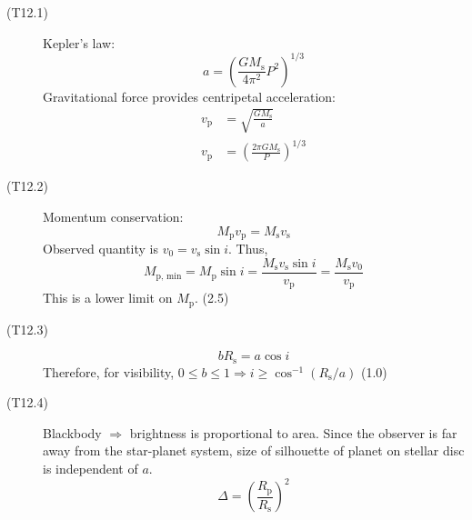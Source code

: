 \begin{description}
\item[(T12.1)] Kepler's law:
\[
a = \left(\frac{GM_{\mathrm{s}}}{4\pi^2}P^2\right)^{1/3} \tag*{(1.0)}
\]
Gravitational force provides centripetal acceleration:
\begin{align*}
v_{\mathrm{p}} &= \sqrt{\frac{GM_{\mathrm{s}}}{a}} \tag*{(0.5)}\\
v_{\mathrm{p}} &= \left(\frac{2\pi GM_{\mathrm{s}}}{P}\right)^{1/3}
  \tag*{(1.5)}
\end{align*}

\item[(T12.2)] Momentum conservation:
\[
M_{\mathrm{p}}v_{\mathrm{p}} = M_{\mathrm{s}}v_{\mathrm{s}} \tag*{(1.5)}
\]
Observed quantity is $v_0 = v_{\mathrm{s}}\sin i$. Thus,
\[
M_{\mathrm{p,\,min}} = M_{\mathrm{p}}\sin i
 = \frac{M_{\mathrm{s}}v_{\mathrm{s}}\sin i}{v_{\mathrm{p}}}
 = \frac{M_{\mathrm{s}}v_0}{v_{\mathrm{p}}}
\]
This is a lower limit on $M_{\mathrm{p}}$. \hfill(2.5)

\item[(T12.3)]
\[
bR_{\mathrm{s}} = a\cos i \tag*{(1.0)}
\]
Therefore, for visibility,
$0 \leq b \leq 1 \Rightarrow i \geq \cos^{-1}(R_{\mathrm{s}}/a)$ \hfill(1.0)

\item[(T12.4)] Blackbody $\Rightarrow$ brightness is proportional to area.
Since the observer is far away from the star-planet system, size of
silhouette of planet on stellar disc is independent of $a$.
\[
\Delta = \left(\frac{R_{\mathrm{p}}}{R_{\mathrm{s}}}\right)^2 \tag*{(1.0)}
\]


\end{description}
